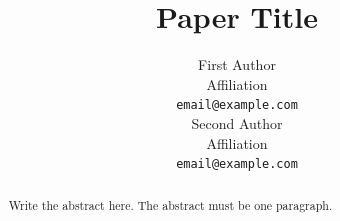 \documentclass{article} %
\title{Paper Title}
\author{First Author \\
Affiliation \\
\texttt{email@example.com} \\
\And
Second Author \\
Affiliation \\
\texttt{email@example.com}
}
\begin{document}
\maketitle

\begin{abstract}
Write the abstract here. The abstract must be one paragraph.
\end{abstract}










\appendix

\end{document}
